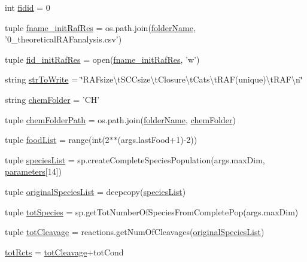 \begin{DoxyCompactItemize}
int \hyperlink{a00104_afdd976dc87dc056c8cba6926f9f98287}{fidid} = 0
\item 
tuple \hyperlink{a00104_a139a15a6b4127dd23049cb2b91a85d77}{fname\-\_\-init\-Raf\-Res} = os.\-path.\-join(\hyperlink{a00104_aa51c106700ef9afbdb94a1c800e10569}{folder\-Name}, '0\-\_\-theoretical\-R\-A\-Fanalysis.\-csv')
\item 
tuple \hyperlink{a00104_a2f15742bdb2c2cebe65c8e9730915e28}{fid\-\_\-init\-Raf\-Res} = open(\hyperlink{a00104_a139a15a6b4127dd23049cb2b91a85d77}{fname\-\_\-init\-Raf\-Res}, 'w')
\item 
string \hyperlink{a00104_a2425798997b1c46c8bbed77ecffcaa9f}{str\-To\-Write} = \char`\"{}R\-A\-Fsize\textbackslash{}t\-S\-C\-Csize\textbackslash{}t\-Closure\textbackslash{}t\-Cats\textbackslash{}t\-R\-A\-F(unique)\textbackslash{}t\-R\-A\-F\textbackslash{}n\char`\"{}
\item 
string \hyperlink{a00104_a4a57e1e8a830824b985f34ee1af52b93}{chem\-Folder} = 'C\-H'
\item 
tuple \hyperlink{a00104_a633d7089af5a033807ccba3b7e9ad483}{chem\-Folder\-Path} = os.\-path.\-join(\hyperlink{a00104_aa51c106700ef9afbdb94a1c800e10569}{folder\-Name}, \hyperlink{a00104_a4a57e1e8a830824b985f34ee1af52b93}{chem\-Folder})
\item 
tuple \hyperlink{a00104_a402edf66e27aa29932e16311c9756b02}{food\-List} = range(int(2$\ast$$\ast$(args.\-last\-Food+1)-\/2))
\item 
tuple \hyperlink{a00104_a79af2b1d3fe38f2cd259cc56b1ecc5f3}{species\-List} = sp.\-create\-Complete\-Species\-Population(args.\-max\-Dim, \hyperlink{a00104_a646de756d594b9a0eebf18c4eb9ee0d6}{parameters}\mbox{[}14\mbox{]})
\item 
tuple \hyperlink{a00104_ab4024b0cf8a4136e81ae636c9cf6e0e4}{original\-Species\-List} = deepcopy(\hyperlink{a00104_a79af2b1d3fe38f2cd259cc56b1ecc5f3}{species\-List})
\item 
tuple \hyperlink{a00104_a7f8e1635318ca1aac728dd7165aa49b5}{tot\-Species} = sp.\-get\-Tot\-Number\-Of\-Species\-From\-Complete\-Pop(args.\-max\-Dim)
\item 
tuple \hyperlink{a00104_a517da3913f56e5216fa2c68818e04ecc}{tot\-Cleavage} = reactions.\-get\-Num\-Of\-Cleavages(\hyperlink{a00104_ab4024b0cf8a4136e81ae636c9cf6e0e4}{original\-Species\-List})
\item 
\hyperlink{a00104_a1c0855f92c2dd2dd4a30f6624f6e1af0}{tot\-Rcts} = \hyperlink{a00104_a517da3913f56e5216fa2c68818e04ecc}{tot\-Cleavage}+tot\-Cond
\item 
$$
\end{DoxyCompactItemize}
